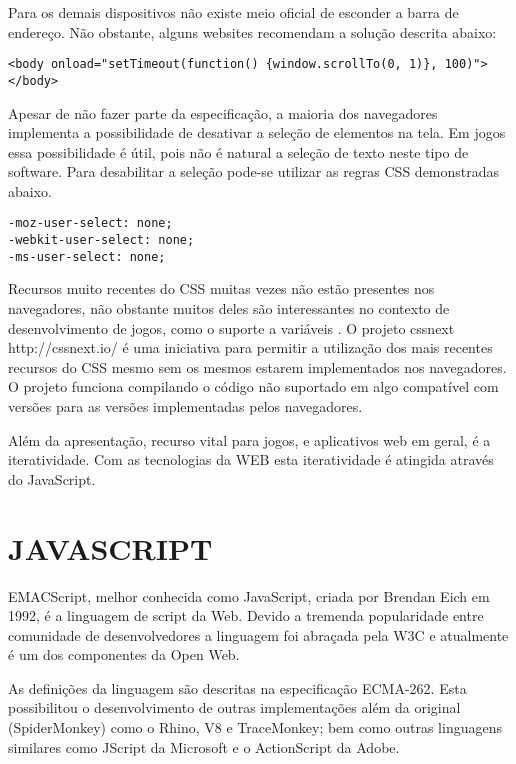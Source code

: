 Para os demais dispositivos não existe meio oficial de esconder a barra
de endereço. Não obstante, alguns websites recomendam a solução descrita abaixo:

\begin{verbatim}
<body onload="setTimeout(function() {window.scrollTo(0, 1)}, 100)">
</body>
\end{verbatim}

Apesar de não fazer parte da especificação, a maioria dos navegadores
implementa a possibilidade de desativar a seleção de elementos na tela.
Em jogos essa possibilidade é útil, pois não é natural a seleção de texto
neste tipo de software. Para desabilitar a seleção pode-se utilizar as 
regras CSS demonstradas abaixo.

\begin{verbatim}
-moz-user-select: none;
-webkit-user-select: none;
-ms-user-select: none;
\end{verbatim}

Recursos muito recentes do CSS muitas vezes não estão presentes nos
navegadores, não obstante muitos deles são interessantes no contexto
de desenvolvimento de jogos, como o suporte a variáveis .
O projeto cssnext http://cssnext.io/ é uma iniciativa para permitir
a utilização dos mais recentes recursos do CSS mesmo sem os mesmos
estarem implementados nos navegadores. O projeto funciona compilando o
código não suportado em algo compatível com versões para as versões
implementadas pelos navegadores.


Além da apresentação, recurso vital para jogos, e aplicativos web em
geral, é a iteratividade. Com as tecnologias da WEB esta iteratividade
é atingida através do JavaScript.

\section{JAVASCRIPT}

EMACScript, melhor conhecida como JavaScript, criada por Brendan Eich em
1992, é a linguagem de script da Web. Devido a tremenda popularidade
entre comunidade de desenvolvedores a linguagem foi abraçada pela W3C e
atualmente é um dos componentes da Open Web.

As definições da linguagem são descritas na especificação ECMA-262.
Esta possibilitou o desenvolvimento de outras implementações além da
original (SpiderMonkey) como o Rhino, V8 e TraceMonkey; bem como
outras linguagens similares como JScript da Microsoft e o ActionScript
da Adobe.


